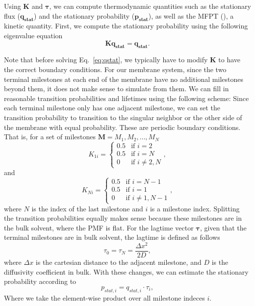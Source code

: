         \par Using $\mathbf{K}$ and $\boldsymbol{\tau}$, we can compute thermodynamic quantities such as the stationary flux ($\mathbf{q_{stat}}$) and the stationary probability ($\mathbf{p_{stat}}$), as well as the MFPT (\mfpt), a kinetic quantity. First, we compute the stationary probability using the following eigenvalue equation
        \begin{equation}
            \mathbf{K} \mathbf{q_{stat}} = \mathbf{q_{stat}}.
            \label{eq:qstat}
        \end{equation}

        \par Note that before solving Eq.~\ref{eq:qstat}, we typically have to modify $\mathbf{K}$ to have the correct boundary conditions. For our membrane system, since the two terminal milestones at each end of the membrane have no additional milestones beyond them, it does not make sense to simulate from them. We can fill in reasonable transition probabilities and lifetimes using the following scheme: Since each terminal milestone only has one adjacent milestone, we can set the transition probability to transition to the singular neighbor or the other side of the membrane with equal probability. These are periodic boundary conditions. That is, for a set of milestones $\mathbf{M}={M_1, M_2, \ldots, M_N}$
        \begin{equation}
            K_{1i} =  \begin{cases}
                0.5 & \text{if } i=2 \\
                0.5 & \text{if } i=N \\
                0 & \text{if } i \neq 2,N
            \end{cases},
        \end{equation}
        and
        \begin{equation}
            K_{Ni} = \begin{cases}
                0.5 & \text{if } i = N-1\\
                0.5 & \text{if } i = 1\\
                0 & \text{if } i \neq 1,N-1
            \end{cases},
        \end{equation}
        where $N$ is the index of the last milestone and $i$ is a milestone index. Splitting the transition probabilities equally makes sense because these milestones are in the bulk solvent, where the PMF is flat. For the lagtime vector $\boldsymbol{\tau}$, given that the terminal milestones are in bulk solvent, the lagtime is defined as follows
        \begin{equation}
            \tau_0 = \tau_N = \frac{\Delta x^2}{2D},
        \end{equation}
        where $\Delta x$ is the cartesian distance to the adjacent milestone, and $D$ is the diffusivity coefficient in bulk. With these changes, we can estimate the stationary probability according to
        \begin{equation}
            p_{stat,i} = q_{stat,i} \cdot \tau_i,
        \end{equation}
        Where we take the element-wise product over all milestone indeces $i$.

